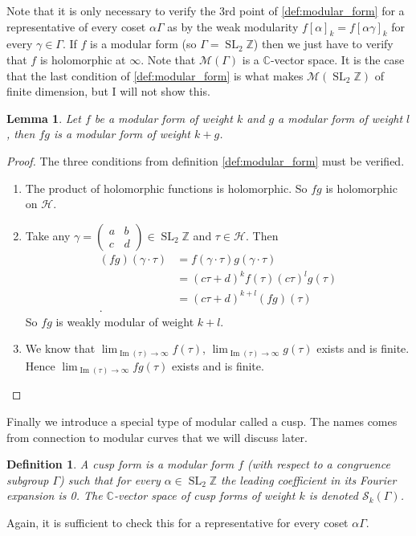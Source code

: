\documentclass[a4paper]{article}
\theoremstyle{theoremdd}
\newtheorem{lemma}[theorem]{Lemma}
\theoremstyle{definitiondd}
\newtheorem{definition}[theorem]{Definition}
\theoremstyle{remarkdd}
\newcommand{\Z}{\mathbb{Z}}
\newcommand{\C}{\mathbb{C}}
\DeclareMathOperator{\im}{Im}
\DeclareMathOperator{\SL}{SL}
\begin{document}
Note that it is only necessary to verify the 3rd point of \cref{def:modular_form} for a representative of every coset $\alpha \Gamma$ as by the weak modularity  $f[\alpha]_k = f[\alpha \gamma]_k$ for every  $\gamma \in \Gamma$. 
If  $f$ is a modular form (so $\Gamma = \SL_2\Z$) then we just have to verify that $f$ is holomorphic at $\infty$.
Note that $\mathcal{M}(\Gamma)$ is a $\C$-vector space. 
It is the case that the last condition of \cref{def:modular_form} is what makes $\mathcal{M} (\SL_2\Z)$ of finite dimension, but I will not show this. 
\begin{lemma}\label{lem:product_modular_forms}
	Let $f$ be a modular form of weight $k$ and $g$ a modular form of weight $l$, then 
	$fg$ is a modular form of weight  $k + g$.
\end{lemma}
\begin{proof}
	The three conditions from definition \ref{def:modular_form} must be verified. 
	\begin{enumerate}
		\item The product of holomorphic functions is holomorphic. So $ fg$ is holomorphic on $\mathcal{H} $. 
		\item Take any  $\gamma = \begin{pmatrix} a & b \\ c & d \end{pmatrix} \in \SL_2\Z$ and $\tau \in \mathcal{H} $. Then 
			\begin{align*}
				(fg)(\gamma \cdot \tau) &= f(\gamma \cdot \tau) g(\gamma \cdot \tau)   \\
							&= (c\tau + d)^{k} f(\tau) (c \tau)^{l} g(\tau) \\
							&= (c\tau + d)^{k+l} (fg)(\tau) \\
			.\end{align*}
			So $fg$ is weakly modular of weight $k+l$. 
		\item We know that $\lim_{\im(\tau) \to \infty} f(\tau)$, $\lim_{\im(\tau) \to \infty} g(\tau)$ exists and is finite. Hence $\lim_{\im(\tau) \to \infty} fg (\tau)$ exists and is finite.		
	\end{enumerate}
\end{proof}

Finally we introduce a special type of modular called a cusp. The names comes from connection to modular curves that we will discuss later.
\begin{definition}\label{def:cusp}
	A \emph{cusp form} is a modular form $f$ (with respect to a congruence subgroup  $\Gamma$) such that for every  $\alpha \in \SL_2\Z$  the leading coefficient in its Fourier expansion is 0. 
	 The $\C$-vector space of cusp forms of weight $k$ is denoted $\mathcal{S} _k(\Gamma)$.
\end{definition}
Again, it is sufficient to check this for a representative for every coset $\alpha \Gamma$.
\end{document}
